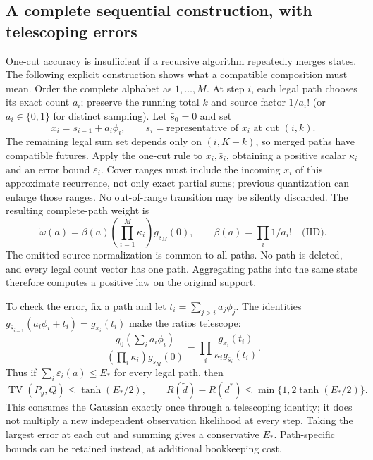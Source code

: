 \documentclass[10pt,a4paper]{article}
\newcommand{\TV}{\operatorname{TV}}
\begin{document}
\subsection{A complete sequential construction, with telescoping errors}
One-cut accuracy is insufficient if a recursive algorithm repeatedly merges states. The following explicit
construction shows what a compatible composition must mean. Order the complete alphabet as $1,\ldots,M$.
At step $i$, each legal path chooses its exact count $a_i$; preserve the running total $k$ and source factor
$1/a_i!$ (or $a_i\in\{0,1\}$ for distinct sampling). Let $\bar s_0=0$ and set
\[
 x_i=\bar s_{i-1}+a_i\phi_i,\qquad
 \bar s_i=\text{representative of }x_i\text{ at cut }(i,k).
\]
The remaining legal sum set depends only on $(i,K-k)$, so merged paths have compatible futures. Apply the
one-cut rule to $x_i,\bar s_i$, obtaining a positive scalar $\kappa_i$ and an error bound $\varepsilon_i$.
Cover ranges must include the incoming $x_i$ of this approximate recurrence, not only exact partial sums;
previous quantization can enlarge those ranges. No out-of-range transition may be silently discarded.
The resulting complete-path weight is
\begin{equation}
 \widetilde\omega(a)=\beta(a)\left(\prod_{i=1}^M\kappa_i\right)g_{\bar s_M}(0),
 \qquad \beta(a)=\prod_i1/a_i!\quad\text{(IID)}.
 \label{eq:quantized-path}
\end{equation}
The omitted source normalization is common to all paths. No path is deleted, and every legal count vector
has one path. Aggregating paths into the same state therefore computes a positive law on the original support.

To check the error, fix a path and let $t_i=\sum_{j>i}a_j\phi_j$. The identities
$g_{\bar s_{i-1}}(a_i\phi_i+t_i)=g_{x_i}(t_i)$ make the ratios telescope:
\begin{equation}
 \frac{g_0(\sum_i a_i\phi_i)}{(\prod_i\kappa_i)g_{\bar s_M}(0)}
 =\prod_i\frac{g_{x_i}(t_i)}{\kappa_i g_{\bar s_i}(t_i)}.
 \label{eq:telescoping-quantization}
\end{equation}
Thus if $\sum_i\varepsilon_i(a)\leq E_*$ for every legal path, then
\begin{equation}
 \TV(P_y,Q)\leq\tanh(E_*/2),\qquad
 R(\widetilde d)-R(d^*)\leq\min\{1,2\tanh(E_*/2)\}.
 \label{eq:quantization-error}
\end{equation}
This consumes the Gaussian exactly once through a telescoping identity; it does not multiply a new
independent observation likelihood at every step. Taking the largest error at each cut and summing gives
a conservative $E_*$. Path-specific bounds can be retained instead, at additional bookkeeping cost.
\end{document}
